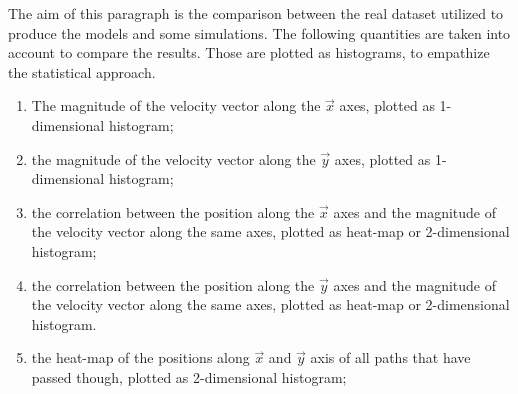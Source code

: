 \documentclass[class=article, crop=false]{standalone}
\begin{document}
The aim of this paragraph is the comparison between the real dataset utilized to produce the models and some simulations.
The following quantities are taken into account to compare the results.
Those are plotted as histograms, to empathize the statistical approach.
\begin{enumerate}[label=(\roman*)]
\item The magnitude of the velocity vector along the $\vec x$ axes, plotted as 1-dimensional histogram;
\item the magnitude of the velocity vector along the $\vec y$ axes, plotted as 1-dimensional histogram;
\item the correlation between the position along the $\vec x$ axes and the magnitude of the velocity vector along the same axes, plotted as heat-map or 2-dimensional histogram;
\item the correlation between the position along the $\vec y$ axes and the magnitude of the velocity vector along the same axes, plotted as heat-map or 2-dimensional histogram.
\item the heat-map of the positions along $\vec x$ and $\vec y$ axis of all paths that have passed though, plotted as 2-dimensional histogram;
\end{enumerate}
\end{document}
